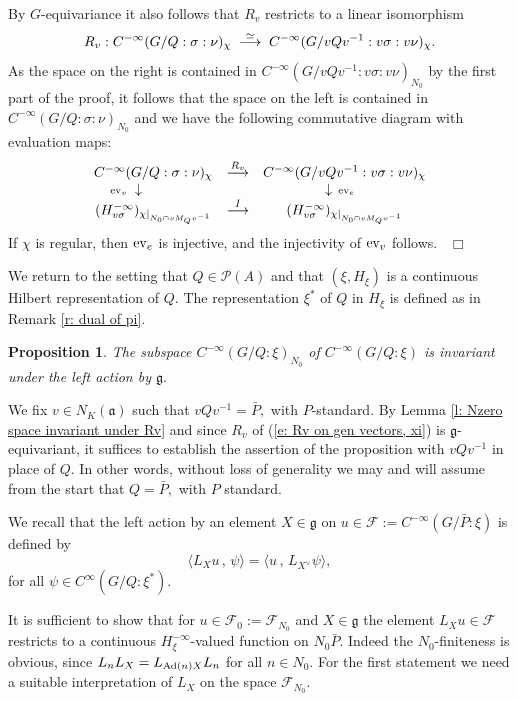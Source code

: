 \documentclass[12pt,a4paper]{article}
\newtheorem{Prop}[Thm]{Proposition}
\newenvironment{prop}[0]{\begin{Prop}\noindent}%
{\end{Prop}}
\def\proof{\par\noindent{\it Proof.}{\ }{\ }}
\def\qed{~\hfill\hbox{$\Box$}\medbreak}
\def\gs{\sigma}
\def\got#1{\mathfrak #1}
\def\fa{{\got a}}
\def\fg{{\got g}}
\def\inp#1#2{\langle#1\,,\,#2\rangle}
\def\Ad{{\rm Ad}}
\def\cF{{\mathcal F}}
\def\cP{{\mathcal P}}
\numberwithin{Thm}{section}
\numberwithin{equation}{section}
\def\ev{{\rm ev}}
\numberwithin{equation}{section}
\def\cchi{\chi}
\def\veec{\vee}%
\begin{document}
By $G$-equivariance it also follows that $R_v$ restricts to a linear isomorphism
$$ 
R_v: C^{-\infty}(G/Q: \gs : \nu)_\cchi \;\; {\buildrel \simeq \over \longrightarrow}\;\; C^{-\infty}(G/vQv^{-1}: v\gs : v \nu)_\cchi.
$$ 
As the space on the right is contained in $C^{-\infty}(G/vQv^{-1}: v\gs : v\nu)_{N_0}$ 
by the first part of the proof, it follows that the space on the left is
contained in $C^{-\infty}(G/Q: \gs : \nu)_{N_0}$ and we have the following 
commutative diagram with evaluation maps:
$$ 
\begin{array}{ccc}
C^{-\infty}(G/Q: \gs : \nu)_\cchi 
& {\buildrel R_v \over \longrightarrow} 
& C^{-\infty}(G/vQv^{-1}: v\gs : v \nu)_\cchi\\
{\!\!\!\!\!\!\!\!\!\!\!\!\!\!\!\scriptstyle \ev_v} \; \downarrow\;\;\;\;\; & &\!\!\!\! \downarrow\, {\scriptstyle \ev_e}\\
(H_{v\gs}^{-\infty})_{\cchi|_{N_0 \cap vM_Qv^{-1}}} 
& {\buildrel I \over \longrightarrow}  & 
(H_{v\gs}^{-\infty})_{\cchi|_{N_0 \cap vM_Qv^{-1}}}
\end{array}
$$ 
If $\cchi$ is regular, then $\ev_e$ is injective, and the injectivity of $\ev_v$ follows.
\qed

We return to the setting that $Q \in \cP(A)$ and that $(\xi, H_\xi)$ is a continuous Hilbert
representation of $Q.$  The representation $\xi^*$ of $Q$ in $H_\xi$ is defined as in Remark \ref{r: dual of pi}.

\begin{prop}
\label{p: nilpotent space invariant under g}
The subspace $C^{-\infty}(G/Q:\xi)_{N_0}$ of 
$C^{-\infty}(G/Q:\xi) $ is invariant under the left action by $\fg.$
\end{prop}
%
\proof
We fix $v \in  N_K(\fa) $ such that $v Q v^{-1} = \bar P,$ with $P$-standard.
By Lemma \ref{l: Nzero space invariant under Rv} and since $R_v$ 
of (\ref{e: Rv on gen vectors, xi}) is $\fg$-equivariant, it suffices to 
establish the assertion of the proposition with $vQv^{-1}$ in place of $Q.$
In other words, without loss of generality we may and will assume from the start
that $Q = \bar P,$ with $P$ standard.

We recall that the left action by an element $X \in \fg$ on $u \in \cF:= C^{-\infty}(G/\bar P: \xi)$ 
is defined by 
$$ 
\inp{L_X u}{\psi} = \inp{u}{L_{X^\veec} \psi},
$$ 
for all $\psi \in C^\infty(G/Q:  \xi^*).$


It is sufficient to show that for $u \in \cF_0:= \cF_{N_0}$ and $X \in \fg$ the element $ L_X u \in \cF$ restricts 
to a continuous $H_\xi^{-\infty}$-valued function on $N_0\bar P.$ Indeed the $N_0$-finiteness is obvious, since $L_{n} L_X = L_{\Ad(n) X} L_n$ for all $n \in N_0.$ For the first statement we need a suitable interpretation of $L_X$ on the space $\cF_{N_0}.$ 
\end{document}
